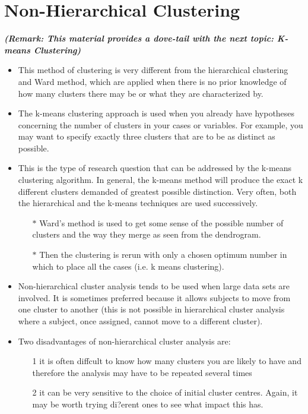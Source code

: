\documentclass[a4paper,12pt]{article}
\begin{document}
\section{Non-Hierarchical Clustering}
\noindent \textbf{\textit{(Remark: This material provides a dove-tail with the next topic: K-means Clustering)}}\\ \smallskip
\begin{itemize}
\item This method of clustering is very different from the hierarchical clustering and Ward method, which are applied when there is no prior knowledge of how many clusters there may be or what they are characterized by.
\item  The k-means clustering approach is used when you already have hypotheses concerning the number of clusters in your cases or variables. For example, you may want to specify exactly three clusters that are to be as distinct as possible.
\item 
This is the type of research question that can be addressed by the k-means clustering algorithm. In general, the k-means method will produce the exact k different clusters demanded of greatest possible distinction. Very often, both the hierarchical and the k-means techniques are used successively.
\begin{itemize}
	\item[$\ast$] Ward's method is used to get some sense of the possible number of clusters and the way they merge as seen from the dendrogram.
\item[$\ast$] Then the clustering is rerun with only a chosen optimum number in which to place all
	the cases (i.e. k means clustering).
\end{itemize}
\item Non-hierarchical cluster analysis tends to be used when large data sets are involved. It is
sometimes preferred because it allows subjects to move from one cluster to another (this is
not possible in hierarchical cluster analysis where a subject, once assigned, cannot move to a
different cluster). 
\item Two disadvantages of non-hierarchical cluster analysis are: 
\begin{itemize}
	\item[1]it is often
	diffcult to know how many clusters you are likely to have and therefore the analysis may have
	to be repeated several times 
	\item[2] it can be very sensitive to the choice of initial cluster centres. Again, it may be worth trying di?erent ones to see what impact this has.
\end{itemize}
\end{itemize}
\end{document}
